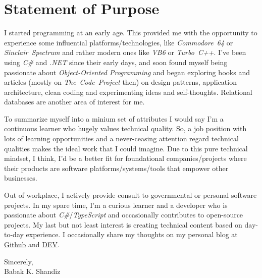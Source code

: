 \documentclass[10pt,a4paper]{article}
\begin{document}


\section*{Statement of Purpose}

I started programming at an early age. This provided me with the opportunity
to experience some influential platforms/technologies, like
\textit{Commodore~64} or \textit{Sinclair~Spectrum} and rather modern ones
like \textit{VB6} or \textit{Turbo~C++}. I've been using \textit{C\#} and
\textit{.NET} since their early days, and soon found myself being passionate
about \textit{Object-Oriented Programming} and began exploring books and
articles (mostly on \textit{The~Code~Project} then) on design patterns,
application architecture, clean coding and experimenting ideas and
self-thoughts. Relational databases are another area of interest for me.

To summarize myself into a minium set of attributes I would say I'm a
continuous learner who hugely values technical quality. So, a job position with
lots of learning opportunities and a never-ceasing attention regard technical
qualities makes the ideal work that I could imagine. Due to this pure technical
mindset, I think, I'd be a better fit for foundational companies/projects where
their products are software platforms/systems/tools that empower other
businesses.

Out of workplace, I actively provide consult to governmental or personal
software projects. In my spare time, I'm a curious learner and a developer who
is passionate about \textit{C\#}/\textit{TypeScript} and occasionally
contributes to open-source projects. My last but not least interest is
creating technical content based on day-to-day experience. I occasionally
share my thoughts on my personal blog at
\href{https://babakks.github.io}{Github} and
\href{https://dev.to/babakks}{DEV}.

\vspace{2em}
\noindent
Sincerely, \\
\noindent
Babak K. Shandiz
\end{document}
